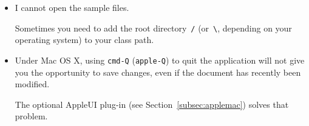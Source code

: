 \begin{itemize}






\item I cannot open the sample files.

Sometimes you need to add the root directory~\texttt{/}
(or~\verb:\:, depending on your operating system) to your class path.

\item Under Mac OS X, using \texttt{cmd-Q} (\texttt{apple-Q})
to quit the application will not give you the opportunity
to save changes, even if the document has recently been modified.

The optional AppleUI plug-in (see
  Section~\ref{subsec:applemac}) solves that problem.
\end{itemize}






